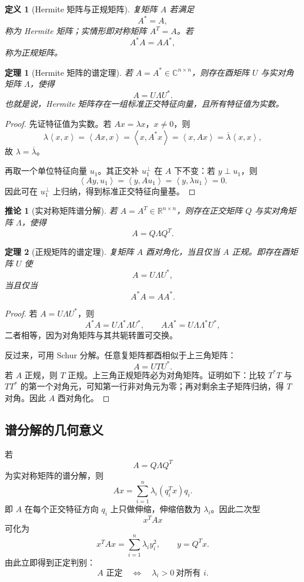 \documentclass[UTF8,openany,zihao=-4]{ctexbook}
\theoremstyle{cnplain}
\newtheorem{definition}{定义}[chapter]
\newtheorem{theorem}{定理}[chapter]
\newtheorem{corollary}{推论}[chapter]
\newcommand{\R}{\mathbb R}
\newcommand{\C}{\mathbb C}
\newcommand{\inner}[2]{\left\langle #1,#2\right\rangle}
\begin{document}
\begin{definition}[Hermite 矩阵与正规矩阵]
复矩阵 $A$ 若满足
\[
A^*=A,
\]
称为 Hermite 矩阵；实情形即对称矩阵 $A^T=A$。若
\[
A^*A=AA^*,
\]
称为正规矩阵。
\end{definition}

\begin{theorem}[Hermite 矩阵的谱定理]
若 $A=A^*\in\C^{n\times n}$，则存在酉矩阵 $U$ 与实对角矩阵 $\Lambda$，使得
\[
A=U\Lambda U^*.
\]
也就是说，Hermite 矩阵存在一组标准正交特征向量，且所有特征值为实数。
\end{theorem}

\begin{proof}
先证特征值为实数。若 $Ax=\lambda x$，$x\ne0$，则
\[
\lambda\inner{x}{x}=\inner{Ax}{x}=\inner{x}{A^*x}=\inner{x}{Ax}=\overline{\lambda}\inner{x}{x},
\]
故 $\lambda=\overline{\lambda}$。

再取一个单位特征向量 $u_1$。其正交补 $u_1^\perp$ 在 $A$ 下不变：若 $y\perp u_1$，则
\[
\inner{Ay}{u_1}=\inner{y}{Au_1}=\inner{y}{\lambda u_1}=0.
\]
因此可在 $u_1^\perp$ 上归纳，得到标准正交特征向量基。
\end{proof}

\begin{corollary}[实对称矩阵谱分解]
若 $A=A^T\in\R^{n\times n}$，则存在正交矩阵 $Q$ 与实对角矩阵 $\Lambda$，使得
\[
A=Q\Lambda Q^T.
\]
\end{corollary}

\begin{theorem}[正规矩阵的谱定理]
复矩阵 $A$ 酉对角化，当且仅当 $A$ 正规。即存在酉矩阵 $U$ 使
\[
A=U\Lambda U^*,
\]
当且仅当
\[
A^*A=AA^*.
\]
\end{theorem}

\begin{proof}
若 $A=U\Lambda U^*$，则
\[
A^*A=U\Lambda^*\Lambda U^*,
\qquad
AA^*=U\Lambda\Lambda^*U^*,
\]
二者相等，因为对角矩阵与其共轭转置可交换。

反过来，可用 Schur 分解。任意复矩阵都酉相似于上三角矩阵：
\[
A=UTU^*.
\]
若 $A$ 正规，则 $T$ 正规。上三角正规矩阵必为对角矩阵。证明如下：比较 $T^*T$ 与 $TT^*$ 的第一个对角元，可知第一行非对角元为零；再对剩余主子矩阵归纳，得 $T$ 对角。因此 $A$ 酉对角化。
\end{proof}

\subsection{谱分解的几何意义}

若
\[
A=Q\Lambda Q^T
\]
为实对称矩阵的谱分解，则
\[
Ax=\sum_{i=1}^n\lambda_i(q_i^Tx)q_i.
\]
即 $A$ 在每个正交特征方向 $q_i$ 上只做伸缩，伸缩倍数为 $\lambda_i$。因此二次型
\[
x^TAx
\]
可化为
\[
x^TAx=\sum_{i=1}^n\lambda_i y_i^2,
\qquad y=Q^Tx.
\]
由此立即得到正定判别：
\[
A\text{ 正定}\quad\Longleftrightarrow\quad \lambda_i>0\ \text{对所有 }i.
\]
\end{document}
